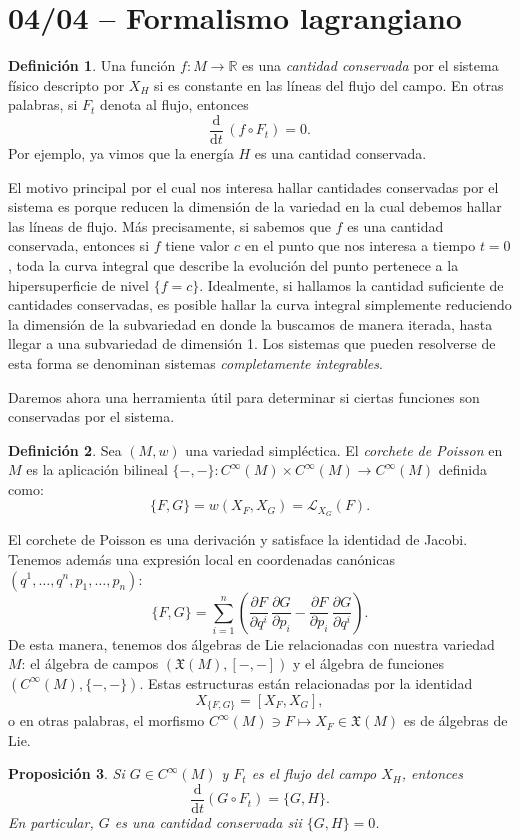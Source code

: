 \documentclass[11pt, a4paper]{article}
\newcommand{\RR}{\mathbb{R}}
\newcommand{\XX}{\mathfrak{X}}
\newcommand{\LL}{\mathcal{L}}
\newcommand{\dd}{\mathrm{d}}
\newcommand{\ddt}{\frac{\dd}{\dd t}}
\newcommand{\pardev}[2]{\frac{\partial #1}{\partial #2}}
\theoremstyle{plain}
\newtheorem{prop}{Proposición}[section]
\theoremstyle{definition}
\newtheorem{defn}[prop]{Definición}
\begin{document}
\section{04/04 -- Formalismo lagrangiano}

\begin{defn} Una función $f:M\to \RR$ es una \emph{cantidad conservada} por el sistema físico descripto por $X_H$ si es constante en las líneas del flujo del campo. En otras palabras, si $F_t$ denota al flujo, entonces
\[\ddt\,( f\circ F_t) = 0.\]
Por ejemplo, ya vimos que la energía $H$ es una cantidad conservada.
\end{defn}
El motivo principal por el cual nos interesa hallar cantidades conservadas por el sistema es porque reducen la dimensión de la variedad en la cual debemos hallar las líneas de flujo. Más precisamente, si sabemos que $f$ es una cantidad conservada, entonces si $f$ tiene valor $c$ en el punto que nos interesa a tiempo $t=0$, toda la curva integral que describe la evolución del punto pertenece a la hipersuperficie de nivel $\{f=c\}$. Idealmente, si hallamos la cantidad suficiente de cantidades conservadas, es posible hallar la curva integral simplemente reduciendo la dimensión de la subvariedad en donde la buscamos de manera iterada, hasta llegar a una subvariedad de dimensión 1. Los sistemas que pueden resolverse de esta forma se denominan sistemas \emph{completamente integrables}.

Daremos ahora una herramienta útil para determinar si ciertas funciones son conservadas por el sistema.

\begin{defn} Sea $(M,w)$ una variedad simpléctica. El \emph{corchete de Poisson} en $M$ es la aplicación bilineal $\{-,-\}:C^\infty(M)\times C^\infty(M)\to C^\infty(M)$ definida como:
\[\{F,G\} = w(X_F,X_G)=\LL_{X_G}(F).\]
\end{defn}
El corchete de Poisson es una derivación y satisface la identidad de Jacobi. Tenemos además una expresión local en coordenadas canónicas $(q^1,\dots,q^n,p_1,\dots,p_n)$:
\[\{F,G\} = \sum_{i=1}^n \left(\pardev{F}{q^i}\,\pardev{G}{p_i} - \pardev{F}{p_i}\,\pardev{G}{q^i}\right).\]
De esta manera, tenemos dos álgebras de Lie relacionadas con nuestra variedad $M$: el álgebra de campos $(\XX(M), [-,-])$ y el álgebra de funciones $(C^\infty(M), \{-,-\})$. Estas estructuras están relacionadas por la identidad
\[X_{\{F,G\}} = [X_F,X_G],\]
o en otras palabras, el morfismo $C^\infty(M)\ni F \mapsto X_F\in\XX(M)$ es de álgebras de Lie.
\begin{prop} Si $G\in C^\infty(M)$ y $F_t$ es el flujo del campo $X_H$, entonces
\[\ddt (G\circ F_t) = \{G, H\}.\]
En particular, $G$ es una cantidad conservada sii $\{G,H\}=0$.
\end{prop}
\end{document}
